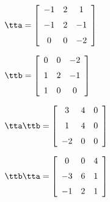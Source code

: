 {$\tta = \left[ \begin {array}{ccc} -1&2&1\\\noalign{\medskip}-1&2&-1
\\\noalign{\medskip}0&0&-2\end {array} \right] $ 

$\ttb =  \left[ \begin {array}{ccc} 0&0&-2\\\noalign{\medskip}1&2&-1
\\\noalign{\medskip}1&0&0\end {array} \right] 
    $}
{$\tta\ttb = \left[ \begin {array}{ccc} 3&4&0\\\noalign{\medskip}1&4&0
\\\noalign{\medskip}-2&0&0\end {array} \right]  $

$\ttb\tta = \left[ \begin {array}{ccc} 0&0&4\\\noalign{\medskip}-3&6&1
\\\noalign{\medskip}-1&2&1\end {array} \right]$ }
 